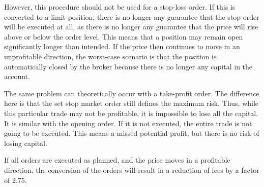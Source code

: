 However, this procedure should not be used for a stop-loss order.
If this is converted to a limit position, there is no longer any guarantee that the stop order will be executed at all, as there is no longer any guarantee that the price will rise above or below the order level.
This means that a position may remain open significantly longer than intended.
If the price then continues to move in an unprofitable direction, the worst-case scenario is that the position is automatically closed by the broker because there is no longer any capital in the account.

The same problem can theoretically occur with a take-profit order.
The difference here is that the set stop market order still defines the maximum risk.
Thus, while this particular trade may not be profitable, it is impossible to lose all the capital.
It is similar with the opening order.
If it is not executed, the entire trade is not going to be executed.
This means a missed potential profit, but there is no risk of losing capital.

If all orders are executed as planned, and the price moves in a profitable direction, the conversion of the orders will result in a reduction of fees by a factor of 2.75.
